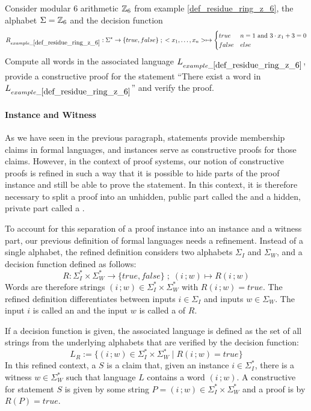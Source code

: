 \begin{exercise} Consider modular $6$ arithmetic $\mathbb{Z}_6$ from  example \ref{def_residue_ring_z_6}, the alphabet $\Sigma = \mathbb{Z}_6$ and the decision function
\begin{equation*}
R_{example\_\ref{def_residue_ring_z_6}} : \Sigma^*\to \{true, false\}\;;\;
<x_1,\ldots,x_n> \mapsto
\begin{cases}
true & n=1 \text{ and } 3\cdot x_1 + 3 = 0\\
false & else
\end{cases}
\end{equation*}
Compute all words in the associated language $L_{example\_\ref{def_residue_ring_z_6}}$, provide a constructive proof for the statement ``There exist a word in $L_{example\_\ref{def_residue_ring_z_6}}$'' and verify the proof.
\end{exercise}
\paragraph{Instance and Witness}
As we have seen in the previous paragraph, statements provide membership claims in formal languages, and instances serve as constructive proofs for those claims. However, in the context of  proof systems, our notion of constructive proofs is refined in such a way that  it is possible to hide parts of the proof instance and still be able to prove the statement. In this context, it is therefore necessary to split a proof into an unhidden, public part called the  and a hidden, private part called a .

To account for this separation of a proof instance into an instance and a witness part, our previous definition of formal languages needs a refinement. Instead of a single alphabet, the refined definition considers two alphabets $\Sigma_I$ and $\Sigma_W$, and a decision function defined as follows:
\begin{equation}
R: \Sigma_I^* \times \Sigma_W^* \to \{true, false\}\;;\; (i\,;w) \mapsto R(i\,;w)
\end{equation}
Words are therefore strings $(i\,;w)\in \Sigma_I^* \times \Sigma_W^*$ with $R(i\,;w)=true$. The refined definition differentiates between inputs $i\in \Sigma_I$ and inputs $w\in \Sigma_W$. The input $i$ is called an  and the input $w$ is called a  of $R$. 

If a decision function is given, the associated language is defined as the set of all strings from the underlying alphabets that are verified by the decision function:
\begin{equation}
\label{def:refined_language}
L_R := \{(i\,;w)\in \Sigma_I^* \times \Sigma_W^* \;|\; R(i\,;w)=true\}
\end{equation}
In this refined context, a  $S$ is a claim that, given an instance $i\in\Sigma_I^*$, there is a witness $w\in \Sigma_W^*$ such that language $L$ contains a word $(i\,;w)$. A constructive  for statement $S$ is given by some string $P=(i\,; w) \in \Sigma_I^* \times \Sigma_W^*$ and a proof is  by $R(P)=true$. 

